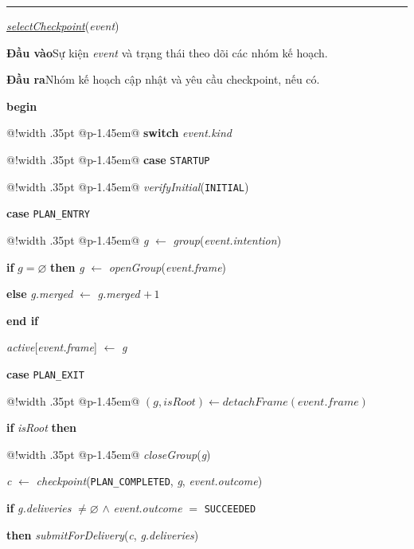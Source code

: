 \documentclass[12pt,a4paper,oneside]{extreport}
\makeatletter
\newenvironment{thesissteps}
  {\par\noindent\begin{tabular}{@{\hspace{.55em}}!{\color{black!50}\vrule width .35pt}%
    @{\hspace{.7em}}p{\dimexpr\linewidth-1.45em\relax}@{}}}
  {\end{tabular}\par}
\makeatother
\begin{document}
\noindent\begin{minipage}{\linewidth}
\setlength{\parindent}{0pt}
\setlength{\parskip}{0pt}
\hrule
\captionsetup{type=thesisalgorithm}
\caption{Chọn ranh giới checkpoint và gom nhóm kế hoạch}\label{alg:checkpoint-selection}
\textit{\underline{selectCheckpoint}}(\textit{event})\par
\textbf{Đầu vào}\quad Sự kiện \textit{event} và trạng thái theo dõi các nhóm kế hoạch.\par
\textbf{Đầu ra}\quad Nhóm kế hoạch cập nhật và yêu cầu checkpoint, nếu có.\par
\textbf{begin}
\begin{thesissteps}
\textbf{switch} \textit{event.kind}\par
\begin{thesissteps}
\textbf{case} \texttt{STARTUP}\par
\begin{thesissteps}
\textit{verifyInitial}(\texttt{INITIAL})
\end{thesissteps}
\textbf{case} \texttt{PLAN\_ENTRY}\par
\begin{thesissteps}
\textit{g} \(\gets\) \textit{group}(\textit{event.intention})\par
\textbf{if} \(g = \varnothing\) \textbf{then} \textit{g} \(\gets\) \textit{openGroup}(\textit{event.frame})\par
\textbf{else} \textit{g.merged} \(\gets\) \textit{g.merged} \(+\,1\)\par
\textbf{end if}\par
\textit{active}[\textit{event.frame}] \(\gets\) \textit{g}
\end{thesissteps}
\textbf{case} \texttt{PLAN\_EXIT}\par
\begin{thesissteps}
\((g,\mathit{isRoot}) \gets \mathit{detachFrame}(\mathit{event.frame})\)\par
\textbf{if} \textit{isRoot} \textbf{then}
\begin{thesissteps}
\textit{closeGroup}(\textit{g})\par
\textit{c} \(\gets\) \textit{checkpoint}(\texttt{PLAN\_COMPLETED}, \textit{g}, \textit{event.outcome})\par
\textbf{if} \textit{g.deliveries} \(\ne \varnothing\) \(\land\) \textit{event.outcome} \(=\) \texttt{SUCCEEDED}\par
\quad \textbf{then} \textit{submitForDelivery}(\textit{c}, \textit{g.deliveries})\par

\end{thesissteps}
\end{thesissteps}
\end{thesissteps}
\end{thesissteps}
\end{minipage}
\end{document}
